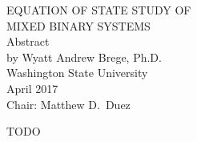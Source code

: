 \label{chap:chapter-1}

\begin{center}
  \begin{singlespace}
    \label{ssec:abstract}

    {\uppercase{
        Equation of State Study of\\
        \bigskip
        Mixed Binary Systems\\}}
    \bigskip
    Abstract\\
    \bigskip \bigskip \bigskip
    by Wyatt Andrew Brege, Ph.D.\\
    Washington State University\\
    April 2017\\
    \bigskip \bigskip \bigskip
    Chair: Matthew D.\ Duez
  \end{singlespace}
\end{center}
  
TODO

\newpage